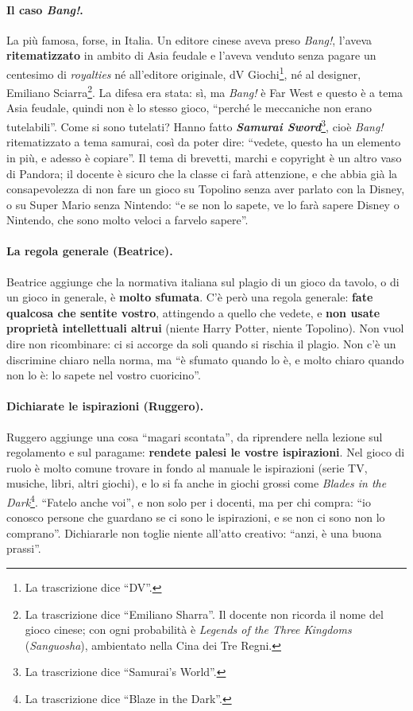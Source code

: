 \paragraph{Il caso \emph{Bang!}.} La più famosa, forse, in Italia. Un editore cinese
aveva preso \emph{Bang!}, l'aveva \textbf{ritematizzato} in ambito di Asia feudale e
l'aveva venduto senza pagare un centesimo di \emph{royalties} né all'editore
originale, dV Giochi\footnote{La trascrizione dice ``DV''.}, né al designer, Emiliano
Sciarra\footnote{La trascrizione dice ``Emiliano Sharra''. Il docente non ricorda il
nome del gioco cinese; con ogni probabilità è \emph{Legends of the Three Kingdoms}
(\emph{Sanguosha}), ambientato nella Cina dei Tre Regni.}. La difesa era stata: sì,
ma \emph{Bang!} è Far West e questo è a tema Asia feudale, quindi non è lo stesso
gioco, ``perché le meccaniche non erano tutelabili''. Come si sono tutelati? Hanno
fatto \textbf{\emph{Samurai Sword}}\footnote{La trascrizione dice ``Samurai's
World''.}, cioè \emph{Bang!} ritematizzato a tema samurai, così da poter dire:
``vedete, questo ha un elemento in più, e adesso è copiare''. Il tema di brevetti,
marchi e copyright è un altro vaso di Pandora; il docente è sicuro che la classe ci
farà attenzione, e che abbia già la consapevolezza di non fare un gioco su Topolino
senza aver parlato con la Disney, o su Super Mario senza Nintendo: ``e se non lo
sapete, ve lo farà sapere Disney o Nintendo, che sono molto veloci a farvelo
sapere''.

\paragraph{La regola generale (Beatrice).} Beatrice aggiunge che la normativa
italiana sul plagio di un gioco da tavolo, o di un gioco in generale, è \textbf{molto
sfumata}. C'è però una regola generale: \textbf{fate qualcosa che sentite vostro},
attingendo a quello che vedete, e \textbf{non usate proprietà intellettuali altrui}
(niente Harry Potter, niente Topolino). Non vuol dire non ricombinare: ci si accorge da
soli quando si rischia il plagio. Non c'è un discrimine chiaro nella norma, ma ``è
sfumato quando lo è, e molto chiaro quando non lo è: lo sapete nel vostro cuoricino''.

\paragraph{Dichiarate le ispirazioni (Ruggero).} Ruggero aggiunge una cosa ``magari
scontata'', da riprendere nella lezione sul regolamento e sul paragame:
\textbf{rendete palesi le vostre ispirazioni}. Nel gioco di ruolo è molto comune
trovare in fondo al manuale le ispirazioni (serie TV, musiche, libri, altri giochi), e
lo si fa anche in giochi grossi come \emph{Blades in the Dark}\footnote{La
trascrizione dice ``Blaze in the Dark''.}. ``Fatelo anche voi'', e non solo per i
docenti, ma per chi compra: ``io conosco persone che guardano se ci sono le
ispirazioni, e se non ci sono non lo comprano''. Dichiararle non toglie niente
all'atto creativo: ``anzi, è una buona prassi''.

